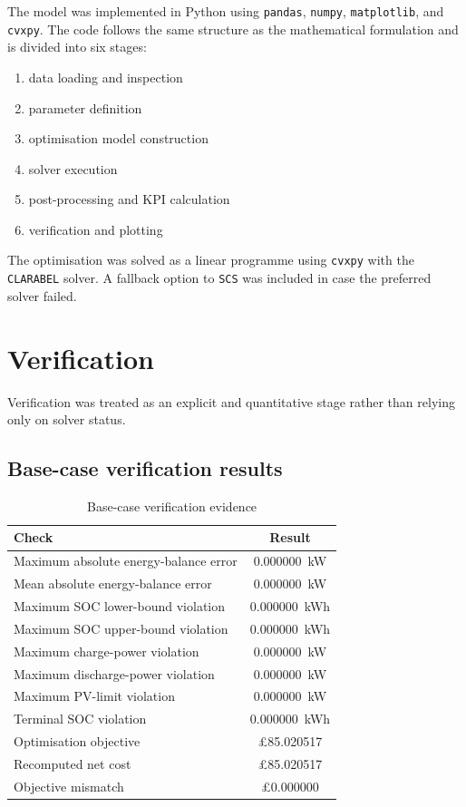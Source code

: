 \documentclass[12pt,a4paper]{article}
\begin{document}
The model was implemented in Python using \texttt{pandas}, \texttt{numpy}, \texttt{matplotlib}, and \texttt{cvxpy}. The code follows the same structure as the mathematical formulation and is divided into six stages:

\begin{enumerate}
    \item data loading and inspection
    \item parameter definition
    \item optimisation model construction
    \item solver execution
    \item post-processing and KPI calculation
    \item verification and plotting
\end{enumerate}

The optimisation was solved as a linear programme using \texttt{cvxpy} with the \texttt{CLARABEL} solver. A fallback option to \texttt{SCS} was included in case the preferred solver failed.

\section{Verification}

Verification was treated as an explicit and quantitative stage rather than relying only on solver status.

\subsection{Base-case verification results}

\begin{table}[H]
\centering
\caption{Base-case verification evidence}
\begin{tabular}{lc}
\toprule
Check & Result \\
\midrule
Maximum absolute energy-balance error & \SI{0.000000}{kW} \\
Mean absolute energy-balance error & \SI{0.000000}{kW} \\
Maximum SOC lower-bound violation & \SI{0.000000}{kWh} \\
Maximum SOC upper-bound violation & \SI{0.000000}{kWh} \\
Maximum charge-power violation & \SI{0.000000}{kW} \\
Maximum discharge-power violation & \SI{0.000000}{kW} \\
Maximum PV-limit violation & \SI{0.000000}{kW} \\
Terminal SOC violation & \SI{0.000000}{kWh} \\
Optimisation objective & \pounds 85.020517 \\
Recomputed net cost & \pounds 85.020517 \\
Objective mismatch & \pounds 0.000000 \\
\bottomrule
\end{tabular}
\end{table}
\end{document}

